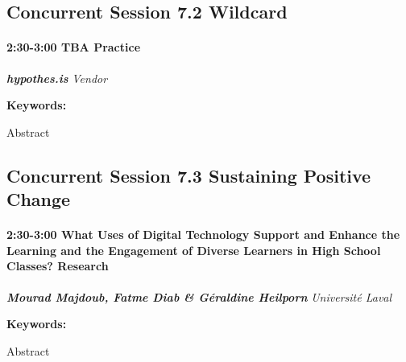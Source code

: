 \documentclass[
]{book}
\begin{document}
\hypertarget{concurrent-session-7.2-wildcard}{%
\subsection*{Concurrent Session 7.2 \textbar{} Wildcard}\label{concurrent-session-7.2-wildcard}}

\begin{session}
\hypertarget{tba-practice}{%
\paragraph*{\texorpdfstring{2:30-3:00 \textbar{} \textbf{TBA} \textbar{}
Practice}{2:30-3:00 \textbar{} TBA \textbar{} Practice}}\label{tba-practice}}

\textbf{\emph{hypothes.is}} \textbar{} \emph{Vendor}

\textbf{Keywords:}

Abstract
\end{session}

\hypertarget{concurrent-session-7.3-sustaining-positive-change}{%
\subsection*{Concurrent Session 7.3 \textbar{} Sustaining Positive Change}\label{concurrent-session-7.3-sustaining-positive-change}}

\begin{session}
\hypertarget{what-uses-of-digital-technology-support-and-enhance-the-learning-and-the-engagement-of-diverse-learners-in-high-school-classes-research}{%
\paragraph*{\texorpdfstring{2:30-3:00 \textbar{} \textbf{What Uses of
Digital Technology Support and Enhance the Learning and the Engagement
of Diverse Learners in High School Classes?} \textbar{}
Research}{2:30-3:00 \textbar{} What Uses of Digital Technology Support and Enhance the Learning and the Engagement of Diverse Learners in High School Classes? \textbar{} Research}}\label{what-uses-of-digital-technology-support-and-enhance-the-learning-and-the-engagement-of-diverse-learners-in-high-school-classes-research}}

\textbf{\emph{Mourad Majdoub, Fatme Diab \& Géraldine Heilporn}}
\textbar{} \emph{Université Laval}

\textbf{Keywords:}

Abstract
\end{session}
\end{document}
